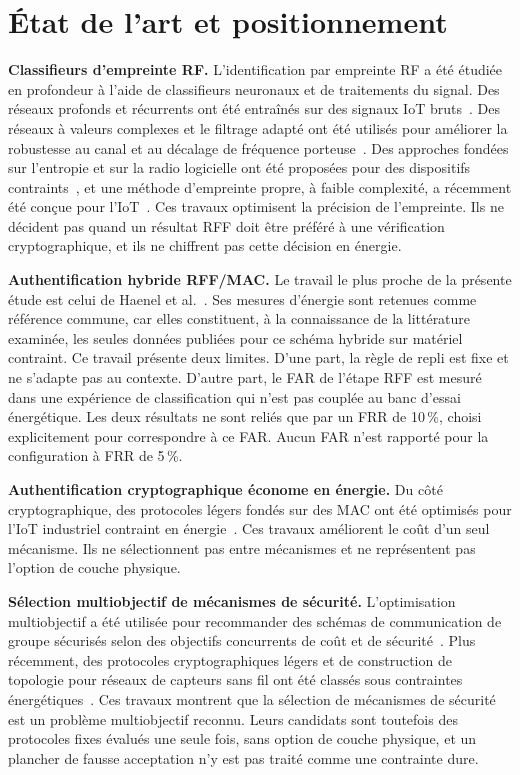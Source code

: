 \documentclass[conference]{IEEEtran}
\begin{document}
\section{État de l'art et positionnement}
\label{sec:related}

\textbf{Classifieurs d'empreinte RF.} L'identification par empreinte RF a été étudiée en profondeur à l'aide de classifieurs neuronaux et de traitements du signal. Des réseaux profonds et récurrents ont été entraînés sur des signaux IoT bruts~\cite{das2018deep,merchant2019enhanced}. Des réseaux à valeurs complexes et le filtrage adapté ont été utilisés pour améliorer la robustesse au canal et au décalage de fréquence porteuse~\cite{gopalakrishnan2019robust,wilson2019integration}. Des approches fondées sur l'entropie et sur la radio logicielle ont été proposées pour des dispositifs contraints~\cite{baldini2017physical,nouichi2019iot}, et une méthode d'empreinte propre, à faible complexité, a récemment été conçue pour l'IoT~\cite{morge2022rf}. Ces travaux optimisent la précision de l'empreinte. Ils ne décident pas quand un résultat RFF doit être préféré à une vérification cryptographique, et ils ne chiffrent pas cette décision en énergie.

\textbf{Authentification hybride RFF/MAC.} Le travail le plus proche de la présente étude est celui de Haenel et al.~\cite{haenel2021practical}. Ses mesures d'énergie sont retenues comme référence commune, car elles constituent, à la connaissance de la littérature examinée, les seules données publiées pour ce schéma hybride sur matériel contraint. Ce travail présente deux limites. D'une part, la règle de repli est fixe et ne s'adapte pas au contexte. D'autre part, le FAR de l'étape RFF est mesuré dans une expérience de classification qui n'est pas couplée au banc d'essai énergétique. Les deux résultats ne sont reliés que par un FRR de 10\,\%, choisi explicitement pour correspondre à ce FAR. Aucun FAR n'est rapporté pour la configuration à FRR de 5\,\%.

\textbf{Authentification cryptographique économe en énergie.} Du côté cryptographique, des protocoles légers fondés sur des MAC ont été optimisés pour l'IoT industriel contraint en énergie~\cite{li2018robust}. Ces travaux améliorent le coût d'un seul mécanisme. Ils ne sélectionnent pas entre mécanismes et ne représentent pas l'option de couche physique.

\textbf{Sélection multiobjectif de mécanismes de sécurité.} L'optimisation multiobjectif a été utilisée pour recommander des schémas de communication de groupe sécurisés selon des objectifs concurrents de coût et de sécurité~\cite{prantl2023recommendation}. Plus récemment, des protocoles cryptographiques légers et de construction de topologie pour réseaux de capteurs sans fil ont été classés sous contraintes énergétiques~\cite{prvulovic2025hermees}. Ces travaux montrent que la sélection de mécanismes de sécurité est un problème multiobjectif reconnu. Leurs candidats sont toutefois des protocoles fixes évalués une seule fois, sans option de couche physique, et un plancher de fausse acceptation n'y est pas traité comme une contrainte dure.
\end{document}
